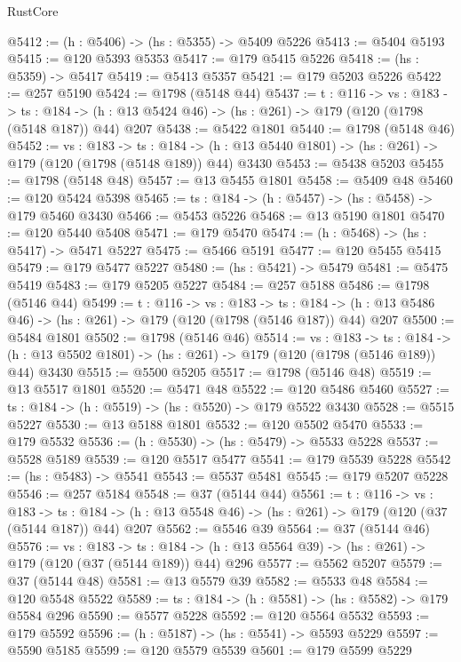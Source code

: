 \begin{lexlean}{RustCore}
\begin{coremodule}
@5412 := (h : @5406) -> (hs : @5355) -> @5409 @5226
@5413 := @5404 @5193
@5415 := @120 @5393 @5353
@5417 := @179 @5415 @5226
@5418 := (hs : @5359) -> @5417
@5419 := @5413 @5357
@5421 := @179 @5203 @5226
@5422 := @257 @5190
@5424 := @1798 (@5148 @44)
@5437 := {t : @116} ->
  {vs : @183} ->
  {ts : @184} -> (h : @13 @5424 @46) -> (hs : @261) -> @179 (@120 (@1798 (@5148 @187)) @44) @207
@5438 := @5422 @1801
@5440 := @1798 (@5148 @46)
@5452 := {vs : @183} ->
  {ts : @184} -> (h : @13 @5440 @1801) -> (hs : @261) -> @179 (@120 (@1798 (@5148 @189)) @44) @3430
@5453 := @5438 @5203
@5455 := @1798 (@5148 @48)
@5457 := @13 @5455 @1801
@5458 := @5409 @48
@5460 := @120 @5424 @5398
@5465 := {ts : @184} -> (h : @5457) -> (hs : @5458) -> @179 @5460 @3430
@5466 := @5453 @5226
@5468 := @13 @5190 @1801
@5470 := @120 @5440 @5408
@5471 := @179 @5470
@5474 := (h : @5468) -> (hs : @5417) -> @5471 @5227
@5475 := @5466 @5191
@5477 := @120 @5455 @5415
@5479 := @179 @5477 @5227
@5480 := (hs : @5421) -> @5479
@5481 := @5475 @5419
@5483 := @179 @5205 @5227
@5484 := @257 @5188
@5486 := @1798 (@5146 @44)
@5499 := {t : @116} ->
  {vs : @183} ->
  {ts : @184} -> (h : @13 @5486 @46) -> (hs : @261) -> @179 (@120 (@1798 (@5146 @187)) @44) @207
@5500 := @5484 @1801
@5502 := @1798 (@5146 @46)
@5514 := {vs : @183} ->
  {ts : @184} -> (h : @13 @5502 @1801) -> (hs : @261) -> @179 (@120 (@1798 (@5146 @189)) @44) @3430
@5515 := @5500 @5205
@5517 := @1798 (@5146 @48)
@5519 := @13 @5517 @1801
@5520 := @5471 @48
@5522 := @120 @5486 @5460
@5527 := {ts : @184} -> (h : @5519) -> (hs : @5520) -> @179 @5522 @3430
@5528 := @5515 @5227
@5530 := @13 @5188 @1801
@5532 := @120 @5502 @5470
@5533 := @179 @5532
@5536 := (h : @5530) -> (hs : @5479) -> @5533 @5228
@5537 := @5528 @5189
@5539 := @120 @5517 @5477
@5541 := @179 @5539 @5228
@5542 := (hs : @5483) -> @5541
@5543 := @5537 @5481
@5545 := @179 @5207 @5228
@5546 := @257 @5184
@5548 := @37 (@5144 @44)
@5561 := {t : @116} ->
  {vs : @183} ->
  {ts : @184} -> (h : @13 @5548 @46) -> (hs : @261) -> @179 (@120 (@37 (@5144 @187)) @44) @207
@5562 := @5546 @39
@5564 := @37 (@5144 @46)
@5576 := {vs : @183} ->
  {ts : @184} -> (h : @13 @5564 @39) -> (hs : @261) -> @179 (@120 (@37 (@5144 @189)) @44) @296
@5577 := @5562 @5207
@5579 := @37 (@5144 @48)
@5581 := @13 @5579 @39
@5582 := @5533 @48
@5584 := @120 @5548 @5522
@5589 := {ts : @184} -> (h : @5581) -> (hs : @5582) -> @179 @5584 @296
@5590 := @5577 @5228
@5592 := @120 @5564 @5532
@5593 := @179 @5592
@5596 := (h : @5187) -> (hs : @5541) -> @5593 @5229
@5597 := @5590 @5185
@5599 := @120 @5579 @5539
@5601 := @179 @5599 @5229

\end{coremodule}
\end{lexlean}
